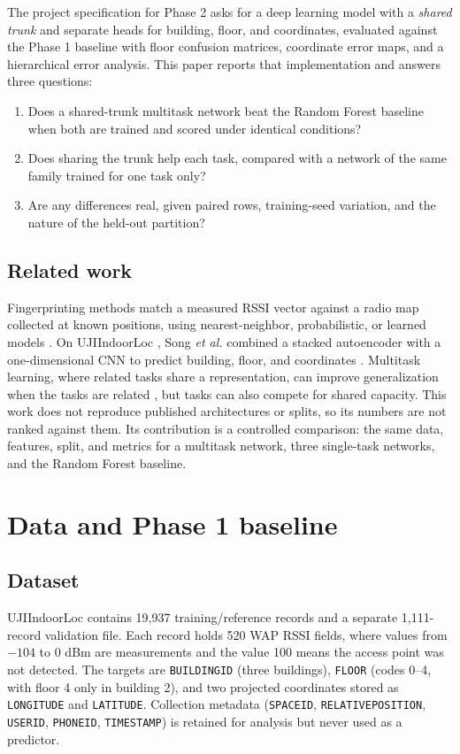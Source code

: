 \documentclass[conference]{IEEEtran}
\begin{document}
The project specification for Phase 2 asks for a deep learning model with a \emph{shared trunk} and separate heads for building, floor, and coordinates, evaluated against the Phase 1 baseline with floor confusion matrices, coordinate error maps, and a hierarchical error analysis. This paper reports that implementation and answers three questions:
\begin{enumerate}[leftmargin=1.6em,itemsep=0.2em,topsep=0.3em]
  \item Does a shared-trunk multitask network beat the Random Forest baseline when both are trained and scored under identical conditions?
  \item Does sharing the trunk help each task, compared with a network of the same family trained for one task only?
  \item Are any differences real, given paired rows, training-seed variation, and the nature of the held-out partition?
\end{enumerate}

\subsection{Related work}
Fingerprinting methods match a measured RSSI vector against a radio map collected at known positions, using nearest-neighbor, probabilistic, or learned models \cite{dawes2011,hechan2016}. On UJIIndoorLoc \cite{torres2014,uci}, Song \emph{et al.} combined a stacked autoencoder with a one-dimensional CNN to predict building, floor, and coordinates \cite{song2019}. Multitask learning, where related tasks share a representation, can improve generalization when the tasks are related \cite{caruana1997}, but tasks can also compete for shared capacity. This work does not reproduce published architectures or splits, so its numbers are not ranked against them. Its contribution is a controlled comparison: the same data, features, split, and metrics for a multitask network, three single-task networks, and the Random Forest baseline.

\section{Data and Phase 1 baseline}
\subsection{Dataset}
UJIIndoorLoc contains 19,937 training/reference records and a separate 1,111-record validation file. Each record holds 520 WAP RSSI fields, where values from $-104$ to $0$ dBm are measurements and the value 100 means the access point was not detected. The targets are \texttt{BUILDINGID} (three buildings), \texttt{FLOOR} (codes 0--4, with floor 4 only in building 2), and two projected coordinates stored as \texttt{LONGITUDE} and \texttt{LATITUDE}. Collection metadata (\texttt{SPACEID}, \texttt{RELATIVEPOSITION}, \texttt{USERID}, \texttt{PHONEID}, \texttt{TIMESTAMP}) is retained for analysis but never used as a predictor.
\end{document}
